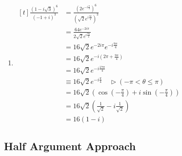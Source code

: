 \documentclass[11pt,a4paper]{book}
\begin{document}
\begin{example}
\begin{enumerate}[label=(\alph*)]
\item
$
\!
\begin{aligned}[t]
{\displaystyle \frac{\left(1-i\sqrt{3}\right)^{6}}{\left(-1+i\right)^{3}}} & =\frac{\left(2e^{-i\frac{\pi}{3}}\right)^{6}}{\left(\sqrt{2}e^{i\frac{3\pi}{4}}\right)^{3}}\\
 & =\frac{64e^{-2i\pi}}{2\sqrt{2}e^{i\frac{9\pi}{4}}}\\
 & =16\sqrt{2}e^{-2i\pi}e^{-i\frac{9\pi}{4}}\\
 & =16\sqrt{2}e^{-i\left(2\pi+\frac{9\pi}{4}\right)}\\
 & =16\sqrt{2}e^{-i\frac{17\pi}{4}}\\
 & \equiv16\sqrt{2}e^{-i\frac{\pi}{4}}\quad\triangleright\left(-\pi<\theta\leq\pi\right)\\
 & =16\sqrt{2}\left(\cos\left(-\frac{\pi}{4}\right)+i\sin\left(-\frac{\pi}{4}\right)\right)\\
 & =16\sqrt{2}\left(\frac{1}{\sqrt{2}}-i\frac{1}{\sqrt{2}}\right)\\
 & =16\left(1-i\right)
\end{aligned}
$

\end{enumerate}

\end{example}

\newpage

\subsection{Half Argument Approach}
\end{document}
